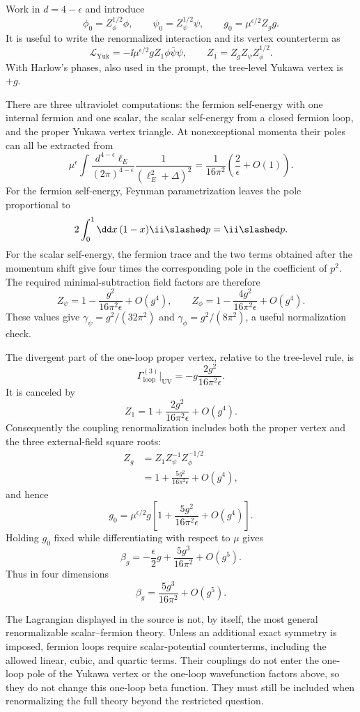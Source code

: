 \begin{enumerate}
Work in \(d=4-\epsilon\) and introduce
\[
 \phi_0=Z_\phi^{1/2}\phi,
 \qquad \psi_0=Z_\psi^{1/2}\psi,
 \qquad
 g_0=\mu^{\epsilon/2}Z_g g.
\]
It is useful to write the renormalized interaction and its vertex
counterterm as
\[
 \mathcal L_{\mathrm{Yuk}}
 =-\ii\mu^{\epsilon/2}gZ_1\phi\bar\psi\psi,
 \qquad Z_1=Z_gZ_\psi Z_\phi^{1/2}.
\]
With Harlow's phases, also used in the prompt, the tree-level Yukawa vertex
is \(+g\).

There are three ultraviolet computations: the fermion self-energy with one
internal fermion and one scalar, the scalar self-energy from a closed
fermion loop, and the proper Yukawa vertex triangle.  At nonexceptional
momenta their poles can all be extracted from
\[
 \mu^\epsilon\int\frac{d^{4-\epsilon}\ell_E}{(2\pi)^{4-\epsilon}}
 \frac1{(\ell_E^2+\Delta)^2}
 =\frac1{16\pi^2}\left(\frac2\epsilon+O(1)\right).
\]
For the fermion self-energy, Feynman parametrization leaves the pole
proportional to
\[
 2\int_0^1\dd x\,(1-x)\ii\slashed p=\ii\slashed p.
\]
For the scalar self-energy, the fermion trace and the two terms obtained
after the momentum shift give four times the corresponding pole in the
coefficient of \(p^2\).  The required minimal-subtraction field factors are
therefore
\[
 \boxed{\;
 Z_\psi=1-\frac{g^2}{16\pi^2\epsilon}+O(g^4),
 \qquad
 Z_\phi=1-\frac{4g^2}{16\pi^2\epsilon}+O(g^4).\;}
\]
These values give
\(\gamma_\psi=g^2/(32\pi^2)\) and
\(\gamma_\phi=g^2/(8\pi^2)\), a useful normalization check.

The divergent part of the one-loop proper vertex, relative to the
tree-level rule, is
\[
 \Gamma^{(3)}_{\mathrm{loop}}\big|_{\mathrm{UV}}
 =-g\frac{2g^2}{16\pi^2\epsilon}.
\]
It is canceled by
\[
 Z_1=1+\frac{2g^2}{16\pi^2\epsilon}+O(g^4).
\]
Consequently the coupling renormalization includes both the proper vertex
and the three external-field square roots:
\[
\begin{aligned}
 Z_g&=Z_1Z_\psi^{-1}Z_\phi^{-1/2}\\
 &=1+\frac{5g^2}{16\pi^2\epsilon}+O(g^4),
\end{aligned}
\]
and hence
\[
 g_0=\mu^{\epsilon/2}g\left[
 1+\frac{5g^2}{16\pi^2\epsilon}+O(g^4)\right].
\]
Holding \(g_0\) fixed while differentiating with respect to \(\mu\) gives
\[
 \beta_g=-\frac\epsilon2g+\frac{5g^3}{16\pi^2}+O(g^5).
\]
Thus in four dimensions
\[
 \boxed{\beta_g=\frac{5g^3}{16\pi^2}+O(g^5).}
\]

The Lagrangian displayed in the source is not, by itself, the most general
renormalizable scalar--fermion theory.  Unless an additional exact symmetry
is imposed, fermion loops require scalar-potential counterterms, including
the allowed linear, cubic, and quartic terms.  Their couplings do not enter
the one-loop pole of the Yukawa vertex or the one-loop wavefunction factors
above, so they do not change this one-loop beta function.  They must still
be included when renormalizing the full theory beyond the restricted
question.


\end{enumerate}
